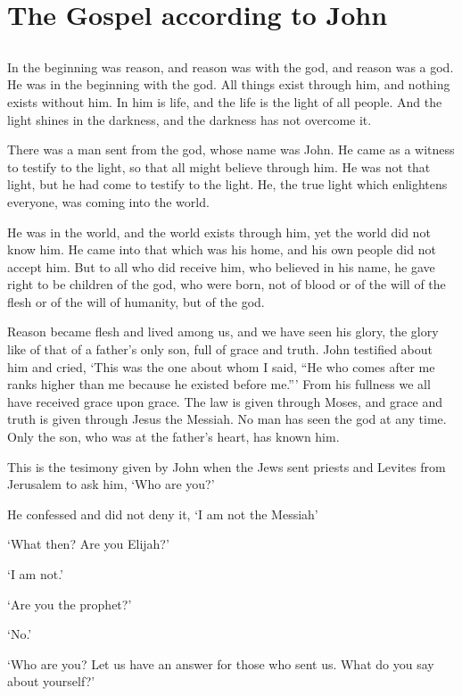 \chapter{The Gospel according to John}

\section{}

In the beginning was reason,
and reason was with the god,
and reason was a god.
He was in the beginning with the god.
All things exist through him,
and nothing exists without him.
In him is life,
and the life is the light of all people.
And the light shines in the darkness,
and the darkness has not overcome it.

There was a man sent from the god,
whose name was John. 
He came as a witness to testify to the light,
so that all might believe through him.
He was not that light,
but he had come to testify to the light.
He, the true light
which enlightens everyone,
was coming into the world.

He was in the world,
and the world exists through him,
yet the world did not know him.
He came into that which was his home,
and his own people did not accept him.
But to all who did receive him, 
who believed in his name, 
he gave right to be children of the god,
who were born, not of blood 
or of the will of the flesh
or of the will of humanity,
but of the god.

Reason became flesh and lived among us,
and we have seen his glory,
the glory like of that of a father's only son, 
full of grace and truth.
John testified about him and cried,
`This was the one about whom I said,
``He who comes after me ranks higher than me
because he existed before me.'''
From his fullness we all have received 
grace upon grace.
The law is given through Moses,
and grace and truth is given through Jesus the Messiah.
No man has seen the god at any time.
Only the son, who was at the father's heart,
has known him.

This is the tesimony given by John 
when the Jews sent priests and Levites from Jerusalem to ask him,
`Who are you?'

He confessed and did not deny it,
`I am not the Messiah'

`What then? Are you Elijah?'

`I am not.'

`Are you the prophet?'

`No.'

`Who are you?  Let us have an answer for those who sent us. 
What do you say about yourself?'

